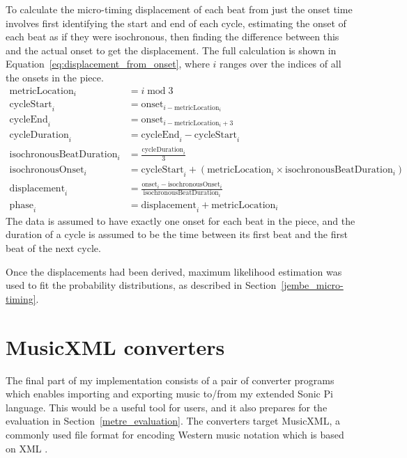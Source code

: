 \documentclass[12pt,twoside,openright]{report}
\begin{document}
To calculate the micro-timing displacement of each beat from just the onset time
involves first identifying the start and end of each cycle, estimating the onset
of each beat as if they were isochronous, then finding the difference between this
and the actual onset to get the displacement. The full calculation is shown in
Equation~\ref{eq:displacement_from_onset}, where $i$ ranges over the indices of all the onsets in the piece.
\begin{equation}
\begin{split}
    \mathrm{metricLocation}_i &= i \;\mathrm{mod}\; 3 \\
    \mathrm{cycleStart}_i     &= \mathrm{onset}_{i-\mathrm{metricLocation}_i} \\
    \mathrm{cycleEnd}_i       &= \mathrm{onset}_{i-\mathrm{metricLocation}_i+3} \\
    \mathrm{cycleDuration}_i  &= \mathrm{cycleEnd}_i - \mathrm{cycleStart}_i \\
    \mathrm{isochronousBeatDuration}_i &= \frac{\mathrm{cycleDuration}_i}{3} \\
    \mathrm{isochronousOnset}_i &= \mathrm{cycleStart}_i + (\mathrm{metricLocation}_i \times \mathrm{isochronousBeatDuration}_i) \\
    \mathrm{displacement}_i &= \frac{\mathrm{onset}_i-\mathrm{isochronousOnset}_i}{\mathrm{isochronousBeatDuration}_i} \\
    \mathrm{phase}_i          &= \mathrm{displacement}_i + \mathrm{metricLocation}_i
\end{split}
\label{eq:displacement_from_onset}
\end{equation}
The data is assumed to have exactly one onset for each beat in the piece, and the
duration of a cycle is assumed to be the time between its first beat and the
first beat of the next cycle.

Once the displacements had been derived, maximum
likelihood estimation was used to fit the probability distributions, as described in
Section~\ref{jembe_micro-timing}.



\section{MusicXML converters} \label{musicxml_converters}

The final part of my implementation consists of a pair of converter programs which enables importing and exporting music to/from my extended Sonic Pi language. This would be a useful tool for users, and it also prepares for the evaluation in Section~\ref{metre_evaluation}. The converters target MusicXML, a commonly used file format for encoding Western music notation which is based on XML \cite{good2001}.
\end{document}
